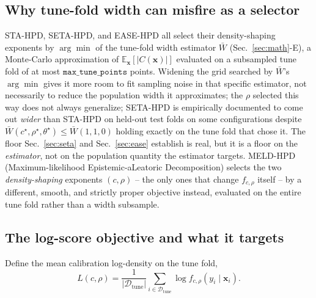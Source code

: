 \documentclass[10pt,twocolumn,a4paper]{article}
\begin{document}
\subsection{Why tune-fold width can misfire as a selector}
STA-HPD, SETA-HPD, and EASE-HPD all select their density-shaping exponents by $\arg\min$ of the
tune-fold width estimator $\bar W$ (Sec.~\ref{sec:math}-E), a Monte-Carlo approximation of
$\mathbb E_{\bm x}[|C(\bm x)|]$ evaluated on a subsampled tune fold of at most $\mathtt{max\_tune\_points}$
points. Widening the grid searched by $\bar W$'s $\arg\min$ gives it more room to fit sampling noise
in that specific estimator, not necessarily to reduce the population width it approximates; the
$\rho$ selected this way does not always generalize; SETA-HPD is empirically documented to come out
\emph{wider} than STA-HPD on held-out test folds on some configurations despite
$\bar W(c^\star,\rho^\star,\theta^\star)\le\bar W(1,1,0)$ holding exactly on the tune fold that chose
it. The floor Sec.~\ref{sec:seta} and Sec.~\ref{sec:ease} establish is real, but it is a floor on the
\emph{estimator}, not on the population quantity the estimator targets. MELD-HPD
(Maximum-likelihood Epistemic-aLeatoric Decomposition) selects the two \emph{density-shaping}
exponents $(c,\rho)$ -- the only ones that change $f_{c,\rho}$ itself -- by a different, smooth, and
strictly proper objective instead, evaluated on the entire tune fold rather than a width subsample.

\subsection{The log-score objective and what it targets}
Define the mean calibration log-density on the tune fold,
\begin{equation}
L(c,\rho) = \frac{1}{|\mathcal D_{\mathrm{tune}}|}\sum_{i\in\mathcal D_{\mathrm{tune}}} \log f_{c,\rho}(y_i\mid\bm x_i).
\label{eq:logscore}
\end{equation}
\end{document}
